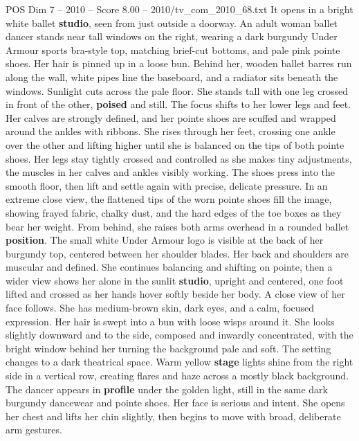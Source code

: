 \begin{textsample}{POS Dim 7 – 2010 – Score 8.00 – 2010/tv\_com\_2010\_68.txt}  \label{ex:f7_pos_053}
It opens in a bright white ballet \textbf{studio}, seen from just outside a doorway.
An adult woman ballet dancer stands near tall windows on the right, wearing a dark burgundy Under Armour sports bra-style top, matching brief-cut bottoms, and pale pink pointe shoes.
Her hair is pinned up in a loose bun.
Behind her, wooden ballet barres run along the wall, white pipes line the baseboard, and a radiator sits beneath the windows.
Sunlight cuts across the pale floor.
She stands tall with one leg crossed in front of the other, \textbf{poised} and still.
The focus shifts to her lower legs and feet.
Her calves are strongly defined, and her pointe shoes are scuffed and wrapped around the ankles with ribbons.
She rises through her feet, crossing one ankle over the other and lifting higher until she is balanced on the tips of both pointe shoes.
Her legs stay tightly crossed and controlled as she makes tiny adjustments, the muscles in her calves and ankles visibly working.
The shoes press into the smooth floor, then lift and settle again with precise, delicate pressure.
In an extreme close view, the flattened tips of the worn pointe shoes fill the image, showing frayed fabric, chalky dust, and the hard edges of the toe boxes as they bear her weight.
From behind, she raises both arms overhead in a rounded ballet \textbf{position}.
The small white Under Armour logo is visible at the back of her burgundy top, centered between her shoulder blades.
Her back and shoulders are muscular and defined.
She continues balancing and shifting on pointe, then a wider view shows her alone in the sunlit \textbf{studio}, upright and centered, one foot lifted and crossed as her hands hover softly beside her body.
A close view of her face follows.
She has medium-brown skin, dark eyes, and a calm, focused expression.
Her hair is swept into a bun with loose wisps around it.
She looks slightly downward and to the side, composed and inwardly concentrated, with the bright window behind her turning the background pale and soft.
The setting changes to a dark theatrical space.
Warm yellow \textbf{stage} lights shine from the right side in a vertical row, creating flares and haze across a mostly black background.
The dancer appears in \textbf{profile} under the golden light, still in the same dark burgundy dancewear and pointe shoes.
Her face is serious and intent.
She opens her chest and lifts her chin slightly, then begins to move with broad, deliberate arm gestures.

\end{textsample}
